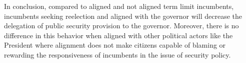 \documentclass[12pt]{amsart}
\numberwithin{equation}{section}
\theoremstyle{definition}
\theoremstyle{definition}
\theoremstyle{definition}
\begin{document}
In conclusion, compared to aligned and not aligned term limit incumbents, incumbents seeking reelection and aligned with the governor will decrease the delegation of public security provision to the governor. Moreover, there is no difference in this behavior when aligned with other political actors like the President where alignment does not make citizens capable of blaming or rewarding the responsiveness of incumbents in the issue of security policy. %
\end{document}
